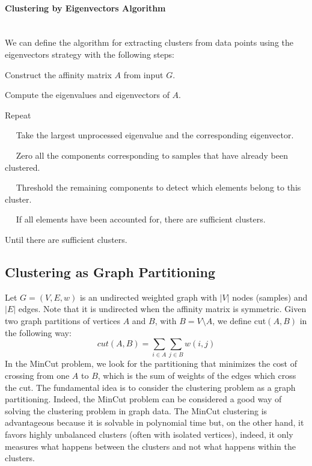 \paragraph*{Clustering by Eigenvectors Algorithm\\\\} 
We can define the algorithm for extracting clusters from data points using the eigenvectors strategy with the following steps:
\begin{enumerate}
\end{enumerate}

\subsection{Clustering as Graph Partitioning}
Let $G=(V,E,w)$ is an undirected weighted graph with $\vert V\vert$ nodes (samples) and $\vert E\vert$ edges. Note that it is undirected when the affinity matrix is symmetric. Given two graph partitions of vertices $A$ and $B$, with $B=V\setminus A$, we define cut$(A,B)$ in the following way:\\
$$cut(A,B) = \sum_{i \in A} \sum_{j \in B} w(i,j)$$
In the MinCut problem, we look for the partitioning that minimizes the cost of crossing from one $A$ to $B$, which is the sum of weights of the edges which cross the cut. The fundamental idea is to consider the clustering problem as a graph partitioning. Indeed, the MinCut problem can be considered a good way of solving the clustering problem in graph data. The MinCut clustering is advantageous because it is solvable in polynomial time but, on the other hand, it favors highly unbalanced clusters (often with isolated vertices), indeed, it only measures what happens between the clusters and not what happens within the clusters.

